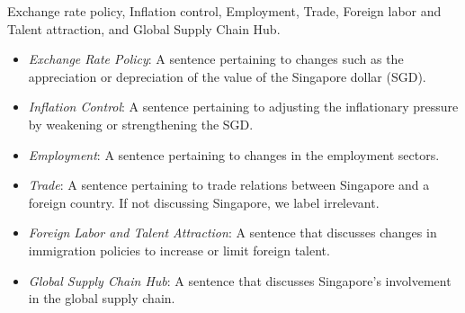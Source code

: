  Exchange rate policy, Inflation control, Employment, Trade, Foreign labor and Talent attraction, and Global Supply Chain Hub.

\begin{itemize}
    \item \emph{Exchange Rate Policy}: A sentence pertaining to changes such as the appreciation or depreciation of the value of the Singapore dollar (SGD).
    \item \emph{Inflation Control}: A sentence pertaining to adjusting the inflationary pressure by weakening or strengthening the SGD.
    \item \emph{Employment}: A sentence pertaining to changes in the employment sectors.
    \item \emph{Trade}: A sentence pertaining to trade relations between Singapore and a foreign country. If not discussing Singapore, we label irrelevant.
    \item \emph{Foreign Labor and Talent Attraction}: A sentence that discusses changes in immigration policies to increase or limit foreign talent.
    \item \emph{Global Supply Chain Hub}: A sentence that discusses Singapore's involvement in the global supply chain.
\end{itemize}

